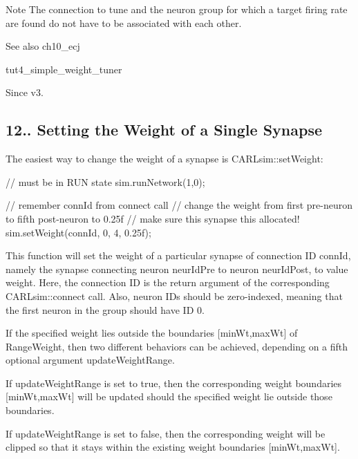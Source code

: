\begin{DoxyNote}{Note}
The connection to tune and the neuron group for which a target firing rate are found do not have to be associated with each other. 
\end{DoxyNote}
\begin{DoxySeeAlso}{See also}
ch10\+\_\+ecj 

tut4\+\_\+simple\+\_\+weight\+\_\+tuner 
\end{DoxySeeAlso}
\begin{DoxySince}{Since}
v3.
\end{DoxySince}
\hypertarget{ch12_advanced_topics_ch12s4s2_set_weight}{}\subsection{12.. Setting the Weight of a Single Synapse}\label{ch12_advanced_topics_ch12s4s2_set_weight}
The easiest way to change the weight of a synapse is C\+A\+R\+Lsim\+::set\+Weight\+: 
\begin{DoxyCode}
\textcolor{comment}{// must be in RUN state}
sim.runNetwork(1,0);

\textcolor{comment}{// remember connId from connect call}
\textcolor{comment}{// change the weight from first pre-neuron to fifth post-neuron to 0.25f}
\textcolor{comment}{// make sure this synapse this allocated!}
sim.setWeight(connId, 0, 4, 0.25f);
\end{DoxyCode}
 This function will set the weight of a particular synapse of connection ID {\ttfamily conn\+Id}, namely the synapse connecting neuron {\ttfamily neur\+Id\+Pre} to neuron {\ttfamily neur\+Id\+Post}, to value {\ttfamily weight}. Here, the connection ID is the return argument of the corresponding C\+A\+R\+Lsim\+::connect call. Also, neuron I\+Ds should be zero-\/indexed, meaning that the first neuron in the group should have ID 0.

If the specified weight lies outside the boundaries {\ttfamily \mbox{[}min\+Wt,max\+Wt\mbox{]}} of Range\+Weight, then two different behaviors can be achieved, depending on a fifth optional argument {\ttfamily update\+Weight\+Range}.
\begin{DoxyItemize}
\item If {\ttfamily update\+Weight\+Range} is set to {\ttfamily true}, then the corresponding weight boundaries {\ttfamily \mbox{[}min\+Wt,max\+Wt\mbox{]}} will be updated should the specified weight lie outside those boundaries.
\item If {\ttfamily update\+Weight\+Range} is set to {\ttfamily false}, then the corresponding weight will be clipped so that it stays within the existing weight boundaries {\ttfamily \mbox{[}min\+Wt,max\+Wt\mbox{]}}.
\end{DoxyItemize}


